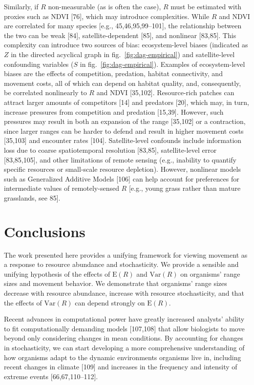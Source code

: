 \documentclass[
  12pt,
]{article}
\begin{document}
Similarly, if \(R\) non-measurable (as is often the case), \(R\) must be estimated with proxies such as NDVI {[}76{]}, which may introduce complexities. While \(R\) and NDVI are correlated for many species {[}e.g., 45,46,95,99--101{]}, the relationship between the two can be weak {[}84{]}, satellite-dependent {[}85{]}, and nonlinear {[}83,85{]}. This complexity can introduce two sources of bias: ecosystem-level biases (indicated as \(Z\) in the directed acyclical graph in fig.~\ref{fig:dag-empirical}) and satellite-level confounding variables (\(S\) in fig.~\ref{fig:dag-empirical}). Examples of ecosystem-level biases are the effects of competition, predation, habitat connectivity, and movement costs, all of which can depend on habitat quality, and, consequently, be correlated nonlinearly to \(R\) and NDVI {[}35,102{]}. Resource-rich patches can attract larger amounts of competitors {[}14{]} and predators {[}20{]}, which may, in turn, increase pressures from competition and predation {[}15,39{]}. However, such pressures may result in both an expansion of the range {[}35,102{]} or a contraction, since larger ranges can be harder to defend and result in higher movement costs {[}35,103{]} and encounter rates {[}104{]}. Satellite-level confounds include information loss due to coarse spatiotemporal resolution {[}83,85{]}, satellite-level error {[}83,85,105{]}, and other limitations of remote sensing (e.g., inability to quantify specific resources or small-scale resource depletion). However, nonlinear models such as Generalized Additive Models {[}106{]} can help account for preferences for intermediate values of remotely-sensed \(R\) {[}e.g., young grass rather than mature grasslands, see 85{]}.

\section{Conclusions}\label{conclusions}

\noindent The work presented here provides a unifying framework for viewing movement as a response to resource abundance and stochasticity. We provide a sensible and unifying hypothesis of the effects of \(\text{E}(R)\) and \(\text{Var}(R)\) on organisms' range sizes and movement behavior. We demonstrate that organisms' range sizes decrease with resource abundance, increase with resource stochasticity, and that the effects of \(\text{Var}(R)\) can depend strongly on \(\text{E}(R)\).

Recent advances in computational power have greatly increased analysts' ability to fit computationally demanding models {[}107,108{]} that allow biologists to move beyond only considering changes in mean conditions. By accounting for changes in stochasticity, we can start developing a more comprehensive understanding of how organisms adapt to the dynamic environments organisms live in, including recent changes in climate {[}109{]} and increases in the frequency and intensity of extreme events {[}66,67,110--112{]}.
\end{document}
